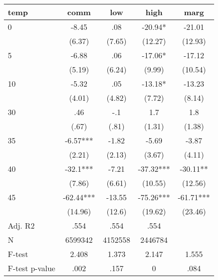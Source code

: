 \documentclass[]{article}
\begin{document}
\begin{tabular}{lcccc} \hline
temp & comm & low & high & marg \\ \hline
0 & -8.45 & .08 & -20.94* & -21.01 \\
 & (6.37) & (7.65) & (12.27) & (12.93) \\
5 & -6.88 & .06 & -17.06* & -17.12 \\
 & (5.19) & (6.24) & (9.99) & (10.54) \\
10 & -5.32 & .05 & -13.18* & -13.23 \\
 & (4.01) & (4.82) & (7.72) & (8.14) \\
30 & .46 & -.1 & 1.7 & 1.8 \\
 & (.67) & (.81) & (1.31) & (1.38) \\
35 & -6.57*** & -1.82 & -5.69 & -3.87 \\
 & (2.21) & (2.13) & (3.67) & (4.11) \\
40 & -32.1*** & -7.21 & -37.32*** & -30.11** \\
 & (7.86) & (6.61) & (10.55) & (12.56) \\
45 & -62.44*** & -13.55 & -75.26*** & -61.71*** \\
 & (14.96) & (12.6) & (19.62) & (23.46) \\
\hline Adj. R2 & .554 & .554 & .554 &  \\
N & 6599342 & 4152558 & 2446784 &  \\
F-test & 2.408 & 1.373 & 2.147 & 1.555 \\
 F-test p-value & .002 & .157 & 0 & .084 \\ \hline
\end{tabular}
\end{document}
